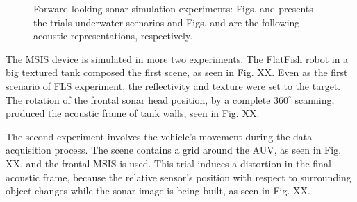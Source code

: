 \documentclass[final,5p,times]{elsarticle}
\begin{document}
\begin{figure}[ht]
{        \label{fig:fls_sim2}
    }
    \captionsetup{justification=centering}
    \caption{Forward-looking sonar simulation experiments: Figs.  and  presents the trials underwater scenarios and Figs.  and  are the following acoustic representations, respectively.}
    \label{fig:fls}
\end{figure}

The MSIS device is simulated in more two experiments. The FlatFish robot in a big textured tank composed the first scene, as seen in Fig. XX. Even as the first scenario of FLS experiment, the reflectivity and texture were set to the target. The rotation of the frontal sonar head position, by a complete $360^{\circ}$ scanning, produced the acoustic frame of tank walls, seen in Fig. XX.

The second experiment involves the vehicle's movement during the data acquisition process. The scene contains a grid around the AUV, as seen in Fig. XX, and the frontal MSIS is used. This trial induces a distortion in the final acoustic frame, because the relative sensor's position with respect to surrounding object changes while the sonar image is being built, as seen in Fig. XX.
\end{document}
